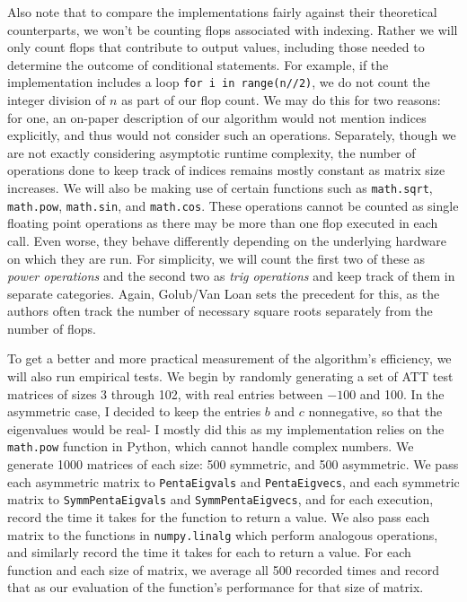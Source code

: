 \documentclass[10pt,twocolumn]{article}
\begin{document}
Also note that to compare the implementations fairly against their theoretical counterparts, we won't be counting flops associated with indexing. Rather we will only count flops that contribute to output values, including those needed to determine the outcome of conditional statements. For example, if the implementation includes a loop \verb|for i in range(n//2)|, we do not count the integer division of $n$ as part of our flop count. We may do this for two reasons: for one, an on-paper description of our algorithm would not mention indices explicitly, and thus would not consider such an operations. Separately, though we are not exactly considering asymptotic runtime complexity, the number of operations done to keep track of indices remains mostly constant as matrix size increases. We will also be making use of certain functions such as \verb|math.sqrt|, \verb|math.pow|, \verb|math.sin|, and \verb|math.cos|. These operations cannot be counted as single floating point operations as there may be more than one flop executed in each call. Even worse, they behave differently depending on the underlying hardware on which they are run. For simplicity, we will count the first two of these as \textit{power operations} and the second two as \textit{trig operations} and keep track of them in separate categories. Again, Golub/Van Loan sets the precedent for this, as the authors often track the number of necessary square roots separately from the number of flops. \cite{Golub_Van_Loan_2013}

To get a better and more practical measurement of the algorithm's efficiency, we will also run empirical tests. We begin by randomly generating a set of ATT test matrices of sizes 3 through 102, with real entries between $-100$ and 100. In the asymmetric case, I decided to keep the entries $b$ and $c$ nonnegative, so that the eigenvalues would be real- I mostly did this as my implementation relies on the \verb|math.pow| function in Python, which cannot handle complex numbers. We generate 1000 matrices of each size: 500 symmetric, and 500 asymmetric. We pass each asymmetric matrix to \verb|PentaEigvals| and \verb|PentaEigvecs|, and each symmetric matrix to \verb|SymmPentaEigvals| and \verb|SymmPentaEigvecs|, and for each execution, record the time it takes for the function to return a value. We also pass each matrix to the functions in \verb|numpy.linalg| which perform analogous operations, and similarly record the time it takes for each to return a value. For each function and each size of matrix, we average all 500 recorded times and record that as our evaluation of the function's performance for that size of matrix.
\end{document}
